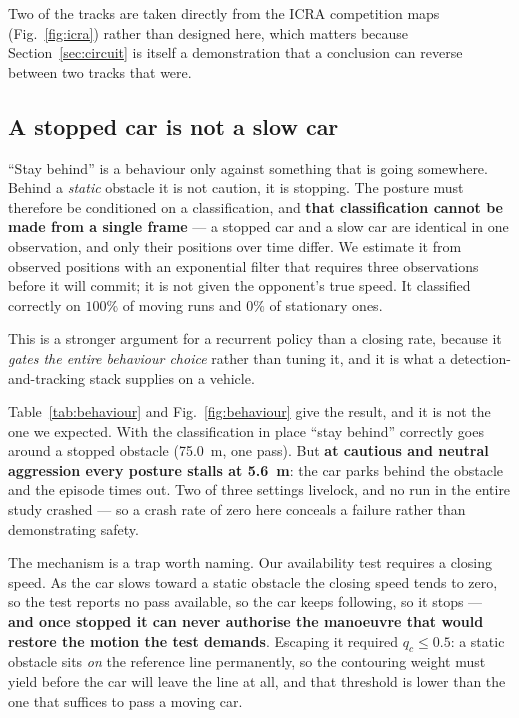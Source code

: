 \documentclass[letterpaper, 10 pt, conference]{ieeeconf}
\begin{document}
Two of the tracks are taken directly from the ICRA competition maps
(Fig.~\ref{fig:icra}) rather than designed here, which matters because
Section~\ref{sec:circuit} is itself a demonstration that a conclusion can
reverse between two tracks that were.

\subsection{A stopped car is not a slow car}\label{sec:static}
``Stay behind'' is a behaviour only against something that is going somewhere.
Behind a \emph{static} obstacle it is not caution, it is stopping. The posture
must therefore be conditioned on a classification, and \textbf{that
classification cannot be made from a single frame} --- a stopped car and a slow
car are identical in one observation, and only their positions over time
differ. We estimate it from observed positions with an exponential filter that
requires three observations before it will commit; it is not given the
opponent's true speed. It classified correctly on $100\%$ of moving runs and
$0\%$ of stationary ones.

This is a stronger argument for a recurrent policy than a closing rate, because
it \emph{gates the entire behaviour choice} rather than tuning it, and it is
what a detection-and-tracking stack supplies on a vehicle.

Table~\ref{tab:behaviour} and Fig.~\ref{fig:behaviour} give the result, and it
is not the one we expected. With the classification in place ``stay behind''
correctly goes around a stopped obstacle (\SI{75.0}{\meter}, one pass). But
\textbf{at cautious and neutral aggression every posture stalls at
\SI{5.6}{\meter}}: the car parks behind the obstacle and the episode times out.
Two of three settings livelock, and no run in the entire study crashed --- so a
crash rate of zero here conceals a failure rather than demonstrating safety.

The mechanism is a trap worth naming. Our availability test requires a closing
speed. As the car slows toward a static obstacle the closing speed tends to
zero, so the test reports no pass available, so the car keeps following, so it
stops --- \textbf{and once stopped it can never authorise the manoeuvre that
would restore the motion the test demands}. Escaping it required
$q_c \le 0.5$: a static obstacle sits \emph{on} the reference line
permanently, so the contouring weight must yield before the car will leave the
line at all, and that threshold is lower than the one that suffices to pass a
moving car.
\end{document}
